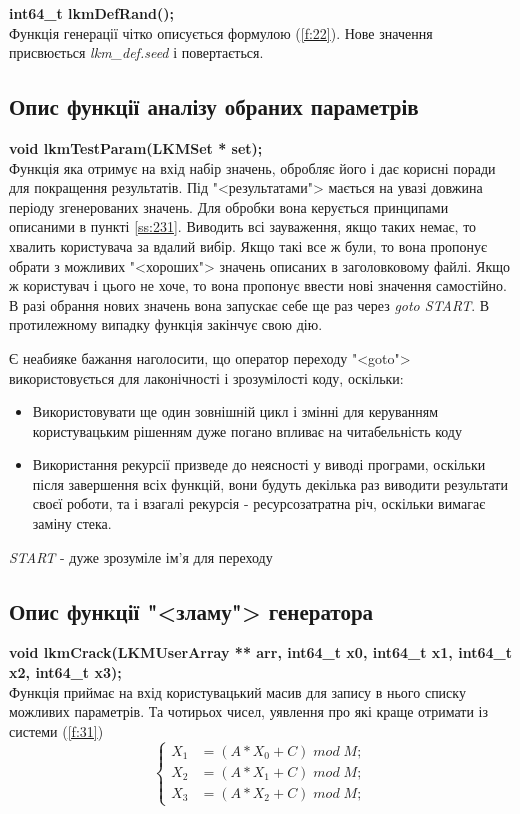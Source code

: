 \documentclass[oneside,final,14pt]{extreport}
\begin{document}
\begin{large}
{\bfseries int64\_t lkmDefRand();}\\
	Функція генерації чітко описується формулою (\ref{f:22}). Нове значення присвюється 
	{\itshape lkm\_def.seed} і повертається.
\subsection{Опис функції аналізу обраних параметрів}\label{ss:333}
{\bfseries void lkmTestParam(LKMSet * set);}\\
	Функція яка отримує на вхід набір значень, обробляє його і дає корисні поради для покращення 
	результатів. Під "<результатами"> мається на увазі довжина періоду згенерованих значень.
	Для обробки вона керується принципами описаними в пункті \ref{ss:231}. Виводить всі зауваження, 
	якщо таких немає, то хвалить користувача за вдалий вибір. Якщо такі все ж були, то вона 
	пропонує обрати з можливих "<хороших"> значень описаних в заголовковому файлі. Якщо ж користувач 
	і цього не хоче, то вона пропонує ввести нові значення самостійно. В разі обрання нових значень 
	вона запускає себе ще раз через {\itshape goto START}. В протилежному випадку функція закінчує свою дію. 

	Є неабияке бажання наголосити, що оператор переходу "<goto"> використовується для лаконічності і 
зрозумілості коду, оскільки:
\begin{itemize}
	\item
Використовувати ще один зовнішній цикл і змінні для керуванням користувацьким рішенням дуже погано 
впливає на читабельність коду
\item
Використання рекурсії призведе до неясності у виводі програми, оскільки після завершення всіх функцій, 
вони будуть декілька раз виводити результати своєї роботи, та і взагалі рекурсія - ресурсозатратна річ, 
оскільки вимагає заміну стека.
\end{itemize}

{\itshape START} - дуже зрозуміле ім'я для переходу
\subsection{Опис функції "<зламу"> генератора}\label{ss:334}
{\bfseries void lkmCrack(LKMUserArray ** arr, int64\_t x0,  int64\_t x1,  int64\_t x2, int64\_t x3);}\\
Функція приймає на вхід користувацький масив для запису в нього списку можливих параметрів. 
Та чотирьох чисел, уявлення про які краще отримати із системи (\ref{f:31})
\begin{equation}
	\begin{cases} 
	X_1 & = (A*X_0+C) \; mod \; M;\\
	X_2 & = (A*X_1+C) \; mod \; M; \\ 
	X_3 & = (A*X_2+C) \; mod \; M; 
	\end{cases}
	\label{f:31}
\end{equation}


\end{large}
\end{document}
